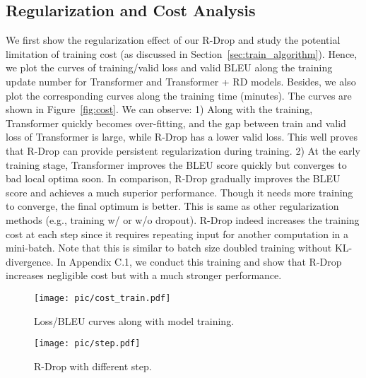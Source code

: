 \documentclass{article}
\begin{document}
\subsection{Regularization and Cost Analysis}
\label{sec:cost}
We first show the regularization effect of our R-Drop and study the potential limitation of training cost (as discussed in Section~\ref{sec:train_algorithm}).
Hence, we plot the curves of training/valid loss and valid BLEU along the training update number for Transformer and Transformer + RD models. Besides, we also plot the corresponding curves along the training time (minutes).
The curves are shown in Figure~\ref{fig:cost}. We can observe: 1) Along with the training, Transformer quickly becomes over-fitting, and the gap between train and valid loss of Transformer is large, while R-Drop has a lower valid loss. This well proves that R-Drop can provide persistent regularization during training. 2) At the early training stage, Transformer improves the BLEU score quickly but converges to bad local optima soon. In comparison, R-Drop gradually improves the BLEU score and achieves a much superior performance. Though it needs more training to converge, the final optimum is better. This is same as other regularization methods (e.g., training w/ or w/o dropout). R-Drop indeed increases the training cost at each step since it requires repeating input  for another computation in a mini-batch. Note that this is similar to batch size doubled training without KL-divergence. In Appendix C.1, we conduct this training and show that R-Drop increases negligible cost but with a much stronger performance.

\begin{figure}[htbp]
\centering
\begin{minipage}[t]{0.55\textwidth}
\centering
\texttt{[image: pic/cost\_train.pdf]}
\caption{Loss/BLEU curves along with model training.}
\label{fig:cost}
\end{minipage}
\begin{minipage}[t]{0.44\textwidth}
\centering
\texttt{[image: pic/step.pdf]}
\caption{R-Drop with different step.}
\label{fig:diff_step}
\end{minipage}
\vspace{-0.3cm}
\end{figure}
\end{document}
